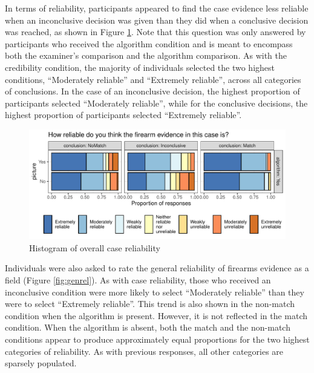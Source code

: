 \documentclass[print]{nuthesis}
\begin{document}
In terms of reliability, participants appeared to find the case evidence less reliable when an inconclusive decision was given than they did when a conclusive decision was reached, as shown in Figure \ref{fig:caserel}.
Note that this question was only answered by participants who received the algorithm condition and is meant to encompass both the examiner's comparison and the algorithm comparison.
As with the credibility condition, the majority of individuals selected the two highest conditions, ``Moderately reliable'' and ``Extremely reliable'', across all categories of conclusions.
In the case of an inconclusive decision, the highest proportion of participants selected ``Moderately reliable'', while for the conclusive decisions, the highest proportion of participants selected ``Extremely reliable''.

\begin{figure}

{\centering \includegraphics[width=\linewidth]{thesis_files/figure-latex/caserel-1} 

}

\caption{Histogram of overall case reliability}\label{fig:caserel}
\end{figure}

Individuals were also asked to rate the general reliability of firearms evidence as a field (Figure \ref{fig:genrel}).
As with case reliability, those who received an inconclusive condition were more likely to select ``Moderately reliable'' than they were to select ``Extremely reliable''.
This trend is also shown in the non-match condition when the algorithm is present.
However, it is not reflected in the match condition.
When the algorithm is absent, both the match and the non-match conditions appear to produce approximately equal proportions for the two highest categories of reliability.
As with previous responses, all other categories are sparsely populated.
\end{document}

